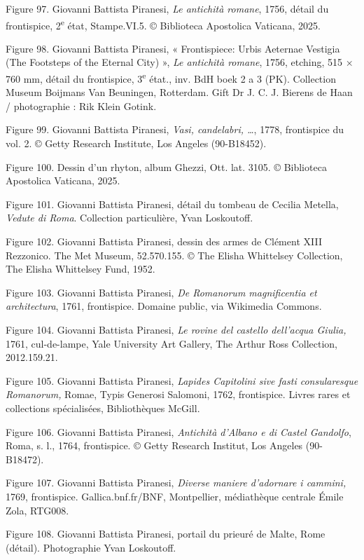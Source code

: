 \documentclass[12pt,twoside,openany]{book}
\begin{document}
Figure 97. Giovanni Battista Piranesi, \textit{Le antichità romane}, 1756, détail du frontispice, 2\textsuperscript{e} état, Stampe.VI.5. © Biblioteca Apostolica Vaticana, 2025.

Figure 98. Giovanni Battista Piranesi, « Frontispiece: Urbis Aeternae Vestigia (The Footsteps of the Eternal City) », \textit{Le antichità romane}, 1756, etching, 515 × 760 mm, détail du frontispice, 3\textsuperscript{e} état., inv. BdH boek 2 a 3 (PK). Collection Museum Boijmans Van Beuningen, Rotterdam. Gift Dr J. C. J. Bierens de Haan / photographie : Rik Klein Gotink.

Figure 99. Giovanni Battista Piranesi, \textit{Vasi, candelabri, …}, 1778, frontispice du vol. 2. © Getty Research Institute, Los Angeles (90-B18452).

Figure 100. Dessin d’un rhyton, album Ghezzi, Ott. lat. 3105. © Biblioteca Apostolica Vaticana, 2025.

Figure 101. Giovanni Battista Piranesi, détail du tombeau de Cecilia Metella, \textit{Vedute di Roma}. Collection particulière, Yvan Loskoutoff.

Figure 102. Giovanni Battista Piranesi, dessin des armes de Clément XIII Rezzonico. The Met Museum, 52.570.155. © The Elisha Whittelsey Collection, The Elisha Whittelsey Fund, 1952.

Figure 103. Giovanni Battista Piranesi, \textit{De Romanorum magnificentia et architectura}, 1761, frontispice. Domaine public, via Wikimedia Commons.

Figure 104. Giovanni Battista Piranesi, \textit{Le rovine del castello dell’acqua Giulia, }1761, cul-de-lampe, Yale University Art Gallery, The Arthur Ross Collection, 2012.159.21.

Figure 105. Giovanni Battista Piranesi, \textit{Lapides Capitolini sive fasti consularesque Romanorum, }Romae, Typis Generosi Salomoni, 1762, frontispice. Livres rares et collections spécialisées, Bibliothèques McGill.

Figure 106. Giovanni Battista Piranesi, \textit{Antichità d’Albano e di Castel Gandolfo}, Roma, s. l., 1764, frontispice. © Getty Research Institut, Los Angeles (90-B18472).

Figure 107. Giovanni Battista Piranesi, \textit{Diverse maniere d’adornare i cammini,} 1769, frontispice. Gallica.bnf.fr/BNF, Montpellier, médiathèque centrale Émile Zola, RTG008.

Figure 108. Giovanni Battista Piranesi, portail du prieuré de Malte, Rome (détail). Photographie Yvan Loskoutoff.
\end{document}
